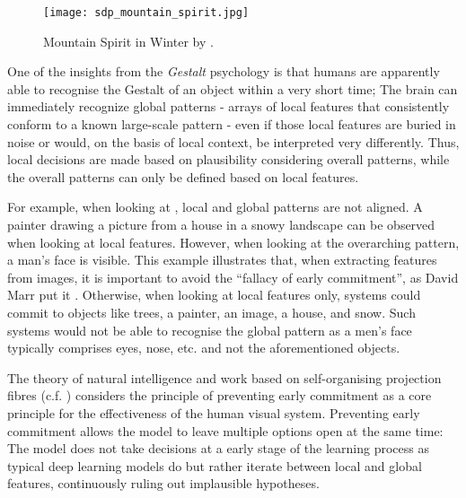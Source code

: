 \begin{figure}[h]
    \centering
    \texttt{[image: sdp\_mountain\_spirit.jpg]}
    \caption[Mountain Spirit in Winter by Sandro del Prete]{Mountain Spirit in Winter by .}
\end{figure}

One of the insights from the \emph{Gestalt} psychology  is that humans are apparently able to recognise the Gestalt of an object within a very short time; The brain can immediately recognize global patterns - arrays of local features that consistently conform to a known large-scale pattern - even if those local features are buried in noise or would, on the basis of local context, be interpreted very differently. Thus, local decisions are made based on plausibility considering overall patterns, while the overall patterns can only be defined based on local features.

For example, when looking at , local and global patterns are not aligned. A painter drawing a picture from a house in a snowy landscape can be observed when looking at local features. However, when looking at the overarching pattern, a man's face is visible.
This example illustrates that, when extracting features from images, it is important to avoid the ``fallacy of early commitment'', as David Marr put it .
Otherwise, when looking at local features only, systems could commit to objects like trees, a painter, an image, a house, and snow. Such systems would not be able to recognise the global pattern as a men's face typically comprises eyes, nose, etc. and not the aforementioned objects.

The theory of natural intelligence  and work based on self-organising projection fibres (c.f. ) considers the principle of preventing early commitment as a core principle for the effectiveness of the human visual system.
Preventing early commitment allows the model to leave multiple options open at the same time: The model does not take decisions at a early stage of the learning process as typical deep learning models do but rather iterate between local and global features, continuously ruling out implausible hypotheses.


